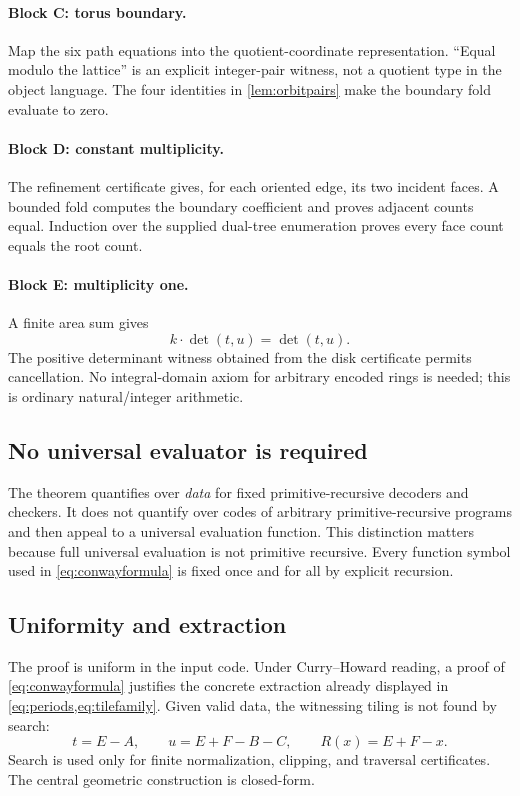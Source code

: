 \paragraph{Block C: torus boundary.}
Map the six path equations into the quotient-coordinate representation.  ``Equal modulo the lattice'' is an explicit integer-pair witness, not a quotient type in the object language.  The four identities in \cref{lem:orbitpairs} make the boundary fold evaluate to zero.

\paragraph{Block D: constant multiplicity.}
The refinement certificate gives, for each oriented edge, its two incident faces.  A bounded fold computes the boundary coefficient and proves adjacent counts equal.  Induction over the supplied dual-tree enumeration proves every face count equals the root count.

\paragraph{Block E: multiplicity one.}
A finite area sum gives
\[
 k\cdot\det(t,u)=\det(t,u).
\]
The positive determinant witness obtained from the disk certificate permits cancellation.  No integral-domain axiom for arbitrary encoded rings is needed; this is ordinary natural/integer arithmetic.

\subsection{No universal evaluator is required}

The theorem quantifies over \emph{data} for fixed primitive-recursive decoders and checkers.  It does not quantify over codes of arbitrary primitive-recursive programs and then appeal to a universal evaluation function.  This distinction matters because full universal evaluation is not primitive recursive.  Every function symbol used in \cref{eq:conwayformula} is fixed once and for all by explicit recursion.

\subsection{Uniformity and extraction}

The proof is uniform in the input code.  Under Curry--Howard reading, a proof of \cref{eq:conwayformula} justifies the concrete extraction already displayed in \cref{eq:periods,eq:tilefamily}.  Given valid data, the witnessing tiling is not found by search:
\[
 t=E-A,
 \qquad u=E+F-B-C,
 \qquad R(x)=E+F-x.
\]
Search is used only for finite normalization, clipping, and traversal certificates.  The central geometric construction is closed-form.
